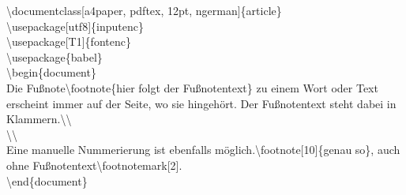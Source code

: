 \color{nounibaredI}\color{nounibaredI}\textbackslash documentclass\color{black}\color{nounibagreenI}[a4paper, pdftex, 12pt, ngerman]\color{black}\{article\} \\
\color{nounibaredI}\color{nounibaredI}\textbackslash usepackage\color{black}\color{nounibagreenI}[utf8]\color{black}\{inputenc\} \\
\color{nounibaredI}\color{nounibaredI}\textbackslash usepackage\color{black}\color{nounibagreenI}[T1]\color{black}\{fontenc\} \\
\color{nounibaredI}\color{nounibaredI}\textbackslash usepackage\color{black}\{babel\} \\
\color{nounibaredI}\color{unibablueI}\textbackslash\color{unibablueI}begin\color{black}\color{black}\{document\} \\
Die Fußnote\color{nounibaredI}\color{nounibaredI}\textbackslash footnote\color{black}\{hier folgt der Fußnotentext\} zu einem Wort oder Text erscheint immer auf der Seite, wo sie hingehört. Der Fußnotentext steht dabei in Klammern.\color{nounibaredI}\color{nounibaredI}\textbackslash \color{nounibaredI}\textbackslash \color{black} \\
\color{nounibaredI}\color{nounibaredI}\textbackslash \color{nounibaredI}\textbackslash \color{black} \\
Eine manuelle Nummerierung ist ebenfalls möglich.\color{nounibaredI}\color{nounibaredI}\textbackslash footnote\color{black}\color{nounibagreenI}[10]\color{black}\{genau so\}, auch ohne Fußnotentext\color{nounibaredI}\color{nounibaredI}\textbackslash footnotemark\color{black}\color{nounibagreenI}[2]\color{black}. \\
\color{nounibaredI}\color{unibablueI}\textbackslash\color{unibablueI}end\color{black}\color{black}\{document\} \\
